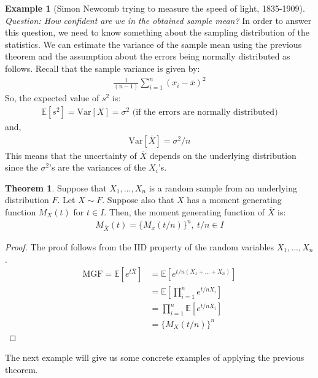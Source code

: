 \documentclass[11pt]{scrartcl}
\theoremstyle{definition}
\newtheorem{theorem}{Theorem}
\newtheorem{ex}{Example}
\theoremstyle{remark}
\newcommand{\svar}[0]{\frac{1}{(n-1)} \sum_{i=1}^n (x_i - \overline{x})^2}
\newcommand{\EX}[1]{\mathbb{E}\left[#1 \right]}
\begin{document}
{\begin{ex}[Simon Newcomb trying to measure the speed of light, 1835-1909]
\emph{Question: How confident are we in the obtained sample mean?} In order to answer this question, we need to know something about the sampling distribution of the statistics. We can estimate the variance of the sample mean using the previous theorem and the assumption about the errors being normally distributed as follows. Recall that the sample variance is given by: 
\begin{align*}	
	\svar 
\end{align*}
So, the expected value of $s^2$ is: 
\begin{align*}
	\EX{s^2} = \text{Var}[X] = \sigma^2 \text{ (if the errors are normally distributed)} 
\end{align*}
and, 
\begin{align*}
	\text{Var}[\overline{X} ] = \sigma^2 / n 	
\end{align*}
This means that the uncertainty of $\overline{X}$ depends on the underlying distribution since the $\sigma^2$'s are the variances of the $X_i$'s. 
\end{ex}

\begin{theorem}
	Suppose that $X_1, ..., X_n$ is a random sample from an underlying distribution $F$. Let $X \sim F$. Suppose also that $X$ has a moment generating function $M_X(t)$ for $t \in I$. Then, the moment generating function of $\overline{X}$ is: 
	\begin{align}
		M_{\overline{X}} (t) = \{ M_x(t/n) \}^n,\ t/n \in I 
	\end{align}
\end{theorem}

\begin{proof} The proof follows from the IID property of the random variables $X_1, ..., X_n$. 
	\begin{align*}
	\text{MGF} = \EX{e^{t\overline{X}}} & =	\EX{e^{t/n (X_1 + ... + X_n)}} \\
						& = \EX{\prod_{i=1}^n e^{t/n X_i}} \\
						& = \prod_{i=1}^n \EX{ e^{t/n X_i }} \\
						& = \{ M_X(t/n) \}^n 
	\end{align*}
\end{proof}

The next example will give us some concrete examples of applying the previous theorem. 

}
\end{document}
